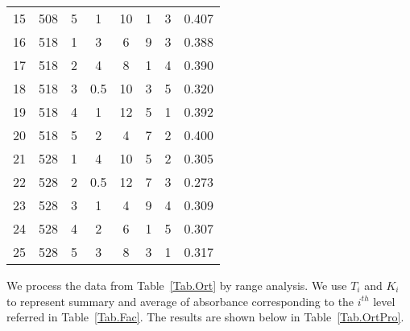 \begin{table}[H]
\begin{tabular}{cccccccc}
    15    & 508           & 5 & 1                  & 10    & 1                  & 3 & 0.407     \\
    16    & 518           & 1 & 3                  & 6     & 9                  & 3 & 0.388     \\
    17    & 518           & 2 & 4                  & 8     & 1                  & 4 & 0.390     \\
    18    & 518           & 3 & 0.5                & 10    & 3                  & 5 & 0.320     \\
    19    & 518           & 4 & 1                  & 12    & 5                  & 1 & 0.392     \\
    20    & 518           & 5 & 2                  & 4     & 7                  & 2 & 0.400     \\
    21    & 528           & 1 & 4                  & 10    & 5                  & 2 & 0.305     \\
    22    & 528           & 2 & 0.5                & 12    & 7                  & 3 & 0.273     \\
    23    & 528           & 3 & 1                  & 4     & 9                  & 4 & 0.309     \\
    24    & 528           & 4 & 2                  & 6     & 1                  & 5 & 0.307     \\
    25    & 528           & 5 & 3                  & 8     & 3                  & 1 & 0.317     \\
    \bottomrule
    \end{tabular}
\end{table}

We process the data from Table~\ref{Tab.Ort} by range analysis. We use $T_i$ and $K_i$ to represent summary and average of absorbance corresponding to the $i^{th}$ level referred in Table~\ref{Tab.Fac}. The results are shown below in Table~\ref{Tab.OrtPro}.

